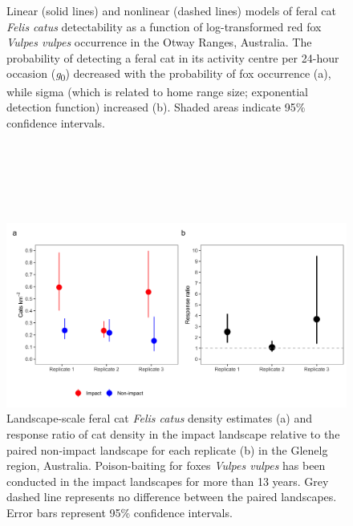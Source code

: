 \documentclass[11pt,a4paper,titlepage,twoside,openright]{style/unimelbthesis}
\begin{document}
\begin{mainmatter}
\begin{figure}
{}

\caption{Linear (solid lines) and nonlinear (dashed lines) models of feral cat \textit{Felis catus} detectability as a function of log-transformed red fox \textit{Vulpes vulpes} occurrence in the Otway Ranges, Australia. The probability of detecting a feral cat in its activity centre per 24-hour occasion (\textit{g}\textsubscript{0}) decreased with the probability of fox occurrence (a), while sigma (which is related to home range size; exponential detection function) increased (b). Shaded areas indicate 95\% confidence intervals.}\label{fig:detcor}
\end{figure}
\newpage

\(~\)

\(~\)

\(~\)
\begin{figure}

{\centering \includegraphics[width=1\linewidth]{figure/glenelg_estimates_600dpi} 

}

\caption{Landscape-scale feral cat \textit{Felis catus} density estimates (a) and response ratio of cat density in the impact landscape relative to the paired non-impact landscape for each replicate (b) in the Glenelg region, Australia. Poison-baiting for foxes \textit{Vulpes vulpes} has been conducted in the impact landscapes for more than 13 years. Grey dashed line represents no difference between the paired landscapes. Error bars represent 95\% confidence intervals.}\label{fig:diffg}
\end{figure}
\newpage

\(~\)

\(~\)

\(~\)
\begin{figure}


\end{figure}
\end{mainmatter}
\end{document}
